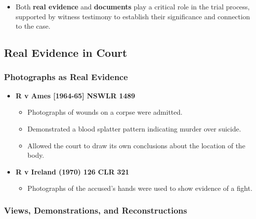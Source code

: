 \begin{itemize}
\tightlist
\item
  Both \textbf{real evidence} and \textbf{documents} play a critical
  role in the trial process, supported by witness testimony to establish
  their significance and connection to the case.
\end{itemize}

\subsection{ Real Evidence in Court}\label{real-evidence-in-court}

\subsubsection{Photographs as Real
Evidence}\label{photographs-as-real-evidence}

\begin{itemize}
\tightlist
\item
  \textbf{R v Ames {[}1964-65{]} NSWLR 1489}

  \begin{itemize}
  \tightlist
  \item
    Photographs of wounds on a corpse were admitted.
  \item
    Demonstrated a blood splatter pattern indicating murder over
    suicide.
  \item
    Allowed the court to draw its own conclusions about the location of
    the body.
  \end{itemize}
\item
  \textbf{R v Ireland (1970) 126 CLR 321}

  \begin{itemize}
  \tightlist
  \item
    Photographs of the accused's hands were used to show evidence of a
    fight.
  \end{itemize}
\end{itemize}

\subsubsection{Views, Demonstrations, and
Reconstructions}\label{views-demonstrations-and-reconstructions}


